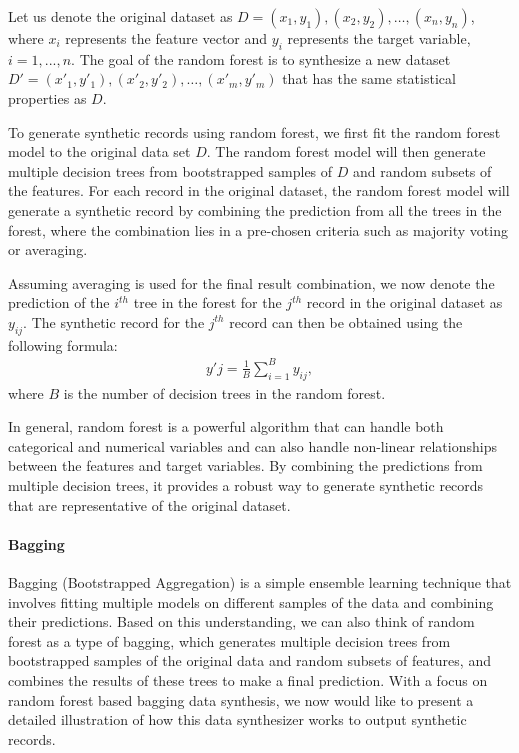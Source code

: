 Let us denote the original dataset as $D = { (x_1,y_1),(x_2,y_2),\dots,(x_n,y_n)}$, where $x_i$ represents the feature vector and $y_i$ represents the target variable, $i=1,...,n$. The goal of the random forest is to synthesize a new dataset $D' = { (x'_1,y'_1),(x'_2,y'_2),\dots,(x'_m,y'_m)}$ that has the same statistical properties as $D$.

To generate synthetic records using random forest, we first fit the random forest model to the original data set $D$. The random forest model will then generate multiple decision trees from bootstrapped samples of $D$ and random subsets of the features. For each record in the original dataset, the random forest model will generate a synthetic record by combining the prediction from all the trees in the forest, where the combination lies in a pre-chosen criteria such as majority voting or averaging.

Assuming averaging is used for the final result combination, we now denote the prediction of the $i^{th}$ tree in the forest for the $j^{th}$ record in the original dataset as $y_{ij}$. The synthetic record for the $j^{th}$ record can then be obtained using the following formula:
\begin{align}
\label{equ:rf}
y'j = \frac{1}{B} \sum_{i=1}^{B} y_{ij},
\end{align}
where $B$ is the number of decision trees in the random forest.

In general, random forest is a powerful algorithm that can handle both categorical and numerical variables and can also handle non-linear relationships between the features and target variables. By combining the predictions from multiple decision trees, it provides a robust way to generate synthetic records that are representative of the original dataset.



\paragraph{Bagging}
Bagging (Bootstrapped Aggregation) is a simple ensemble learning technique that involves fitting multiple models on different samples of the data and combining their predictions. Based on this understanding, we can also think of random forest as a type of bagging, which generates multiple decision trees from bootstrapped samples of the original data and random subsets of features, and combines the results of these trees to make a final prediction. With a focus on random forest based bagging data synthesis, we now would like to present a detailed illustration of how this data synthesizer works to output synthetic records.

